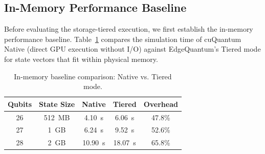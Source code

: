 \begin{table}[t]
\centering
\caption{Our benchmark circuits and their characteristics.}
\label{circuit_info}
\end{table}


\subsection{In-Memory Performance Baseline}
\label{sec:inmemory}

Before evaluating the storage-tiered execution, we first establish the in-memory performance baseline.
Table~\ref{tab:inmemory} compares the simulation time of cuQuantum Native (direct GPU execution without I/O) against EdgeQuantum's Tiered mode for state vectors that fit within physical memory.

\begin{table}[t]
\centering
\caption{In-memory baseline comparison: Native vs. Tiered mode.}
\begin{tabular}{|c|c|c|c|c|}
\hline
\textbf{Qubits} & \textbf{State Size} & \textbf{Native} & \textbf{Tiered} & \textbf{Overhead} \\
\hline
26 & 512~MB & 4.10~s & 6.06~s & 47.8\% \\
27 & 1~GB & 6.24~s & 9.52~s & 52.6\% \\
28 & 2~GB & 10.90~s & 18.07~s & 65.8\% \\
\hline
\end{tabular}
\label{tab:inmemory}
\end{table}

